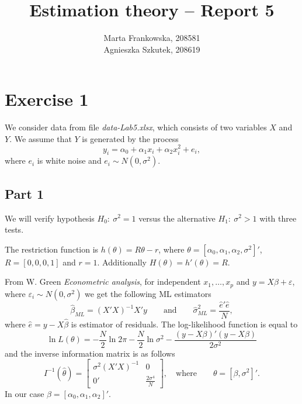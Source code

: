 \documentclass[12pt, a4paper]{article}\usepackage[]{graphicx}\usepackage[]{color}
\begin{document}
\title{Estimation theory -- Report 5}
\author{Marta Frankowska, 208581 \\ Agnieszka Szkutek, 208619}
\maketitle
\tableofcontents 









\section{Exercise 1}

We consider data from file \textit{data-Lab5.xlsx}, which consists of two variables $X$ and $Y$. We assume that $Y$ is generated by the process 
\[ y_i = \alpha_0 + \alpha_1 x_i + \alpha_2 x_i^2 + e_i,  \]
where $e_i$ is white noise and $e_i \sim N(0,\sigma^2)$.

\subsection{Part 1}
We will verify hypothesis $H_0:\ \sigma^2=1$ versus the alternative $H_1:\ \sigma^2>1$ with three tests.

The restriction function is $h(\theta)=R\theta-r$, where $\theta = [\alpha_0,\alpha_1,\alpha_2,\sigma^2]'$, $R= [0,0,0,1]$ and $r=1$. 
Additionally $H(\theta)=h'(\theta)=R$.

From W. Green \textit{Econometric analysis}, for independent $x_1,\dots, x_p$ and $y = X \beta + \varepsilon$, where $ \varepsilon_i \sim N(0,\sigma^2)$ we get the following ML estimators
\[ \hat{\beta}_{ML} = (X'X)^{-1} X' y \qquad\text{and}\qquad \hat{\sigma}^2_{ML} = \frac{\hat{e}' \hat{e}}{N},\]
where $\hat{e} = y-X\hat{\beta}$ is estimator of residuals.
The log-likelihood function is equal to 
\[ \ln{L(\theta)} = -\frac{N}{2}\ln{2\pi} - \frac{N}{2}\ln{\sigma^2} - \frac{(y-X\beta)'(y-X\beta)}{2\sigma^2}\]
and the inverse information matrix is as follows
\[ I^{-1}(\hat{\theta}) =
 \begin{bmatrix}
  \sigma^2(X'X)^{-1} & 0 \\
  0' & \frac{2\sigma^4}{N}
 \end{bmatrix},
 \quad\text{where}\qquad
 \theta = [\beta, \sigma^2]'.
\]
In our case $\beta = [\alpha_0,\alpha_1,\alpha_2]'$.
\end{document}
